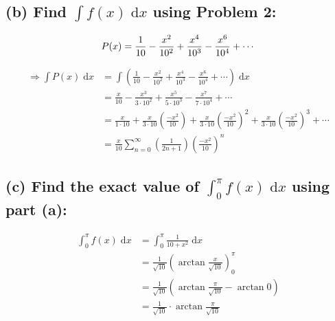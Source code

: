 \documentclass[12pt]{article}
\begin{document}
\subsection*{(b) Find ${\displaystyle \int f(x) \;\mathrm{d}x}$ using Problem 2:}

$$
P(x) = \frac{1}{10}
- \frac{x^2}{10^2}
+ \frac{x^4}{10^3}
- \frac{x^6}{10^4}
+ \cdots\\
$$

\begin{align*}
    \Longrightarrow
    \int P(x)\;\mathrm{d}x
    &= \int \left( \frac{1}{10}
    - \frac{x^2}{10^2}
    + \frac{x^4}{10^3}
    - \frac{x^6}{10^4}
    + \cdots \right) \;\mathrm{d}x\\
    &= \frac{x}{10}
    - \frac{x^3}{3\cdot 10^2}
    + \frac{x^5}{5\cdot 10^3}
    - \frac{x^7}{7\cdot 10^4}
    + \cdots\\
    &= \frac{x}{1\cdot 10}
    + \frac{x}{3\cdot 10} \left(\frac{-x^2}{10} \right)
    + \frac{x}{3\cdot 10} \left(\frac{-x^2}{10} \right)^2
    + \frac{x}{3\cdot 10} \left(\frac{-x^2}{10} \right)^3
    + \cdots\\
    &= \frac{x}{10} \sum_{n=0}^\infty \left(\frac{1}{2n+1}  \right) \left(\frac{-x^2}{10} \right)^n
\end{align*}











\subsection*{(c) Find the exact value of ${\displaystyle \int_0^{\pi} f(x) \;\mathrm{d}x}$ using part (a):}
\begin{align*}
    \int_0^{\pi} f(x) \;\mathrm{d}x &= \int_0^{\pi} \frac{1}{10+x^2} \;\mathrm{d}x\\
    &= \frac{1}{\sqrt{10}} \left( \arctan{\frac{x}{\sqrt{10}}} \right)_0^{\pi}\\
    &= \frac{1}{\sqrt{10}} \left( \arctan{\frac{\pi}{\sqrt{10}}}
    -\arctan{0}\right)\\
    &= \frac{1}{\sqrt{10}}\cdot \arctan{\frac{\pi}{\sqrt{10}}}
\end{align*}
\end{document}
